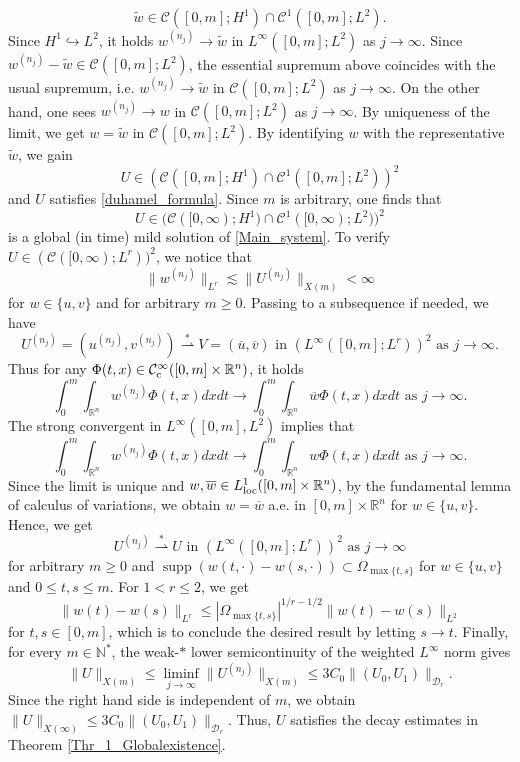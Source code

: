 \documentclass[11pt,reqno]{amsart}
\DeclareMathOperator{\supp}{supp}
\newcommand{\ity}{\infty}
\begin{document}
	\[
	\widetilde w\in \mathcal{C}([0,m];H^1)\cap \mathcal{C}^1([0,m];L^2).
	\]
	Since $H^1\hookrightarrow L^2$, it holds $w^{(n_j)}\to \widetilde w$ in $L^\infty([0,m];L^2)$ as $j\to \ity$. Since $w^{(n_j)}-\widetilde w\in \mathcal{C}([0,m];L^2)$, the essential supremum above coincides with the usual supremum, i.e. $w^{(n_j)}\to \widetilde w$ in $\mathcal{C}([0,m];L^2)$ as $j\to \ity$. On the other hand, one sees $w^{(n_j)}\to w$ in $\mathcal{C}([0,m];L^2)$ as $j\to \ity$. By uniqueness of the limit, we get $w=\widetilde w$ in $\mathcal{C}([0,m];L^2)$. By identifying $w$ with the representative $\widetilde w$, we gain
	\[
	U\in \left(\mathcal{C}([0,m];H^1)\cap \mathcal{C}^1([0,m];L^2)\right)^2
	\]
	and $U$ satisfies \eqref{duhamel_formula}. Since $m$ is arbitrary, one finds that
	\[
	U\in \bigl(\mathcal{C}([0,\infty);H^1)\cap \mathcal{C}^1([0,\infty);L^2)\bigr)^2
	\]
	is a global (in time) mild solution of \eqref{Main_system}. To verify $U\in(\mathcal{C}([0,\infty);L^r))^2$, we notice that
	\[
	\|w^{(n_j)}\|_{L^r}\lesssim \|U^{(n_j)}\|_{X(m)}<\infty
	\]
	for $w\in \{u,v\}$ and for arbitrary $m\geq 0$. Passing to a subsequence if needed, we have
	\[
	U^{(n_j)}=(u^{(n_j)},v^{(n_j)})\stackrel{*}{\rightharpoonup} V=(\overline{u},\overline{v})\text{ in }(L^\infty([0,m];L^r))^2\text{ as }j\to\ity.
	\]
	Thus for any $\Phi(t,x)\in \mathcal{C}^\infty_{\rm c}([0,m]\times \mathbb{R}^n)$, it holds
	\[
	\int_{0}^m\int_{\mathbb{R}^n}w^{(n_j)}\Phi(t,x)dxdt\to \int_{0}^m\int_{\mathbb{R}^n}\overline{w}\Phi(t,x)dxdt\text{ as }j\to\ity.
	\]
	The strong convergent in $L^\infty([0,m],L^2)$ implies that 
	\[
	\int_{0}^m\int_{\mathbb{R}^n}w^{(n_j)}\Phi(t,x)dxdt\to \int_{0}^m\int_{\mathbb{R}^n}w\Phi(t,x)dxdt\text{ as }j\to \ity.
	\]
	Since the limit is unique and $w,\overline{w}\in L^1_{\rm loc}([0,m]\times \mathbb{R}^n)$, by the fundamental lemma of calculus of variations, we obtain $w=\overline{w}$ a.e. in $[0,m]\times \mathbb{R}^n$ for $w\in \{u,v\}$. Hence, we get
	\[
	U^{(n_j)}\stackrel{*}{\rightharpoonup} U\text{ in }(L^\infty([0,m];L^r))^2\text{ as }j\to\ity
	\]
	for arbitrary $m\geq 0$ and $\supp (w(t,\cdot)-w(s,\cdot))\subset \Omega_{\max\{t,s\}}$ for $w\in\{u,v\}$ and $0\leq t,s\leq m$. For $1<r\leq 2$, we get
	\[
	\|w(t)-w(s)\|_{L^r}\leq |\Omega_{\max\{t,s\}}|^{1/r-1/2}\|w(t)-w(s)\|_{L^2}
	\]
	for $t,s\in[0,m]$, which is to conclude the desired result by letting $s\to t$. Finally, for every $m\in \mathbb N^*$, the weak-$*$ lower semicontinuity of the weighted $L^\infty$ norm gives
	\[
	\|U\|_{X(m)}\leq \liminf_{j\to\ity}\|U^{(n_j)}\|_{X(m)}\leq 3C_0\|(U_0,U_1)\|_{\mathcal{D}_r}.
	\]
	Since the right hand side is independent of $m$, we obtain $\|U\|_{X(\infty)}\leq 3C_0\|(U_0,U_1)\|_{\mathcal{D}_r}$. Thus, $U$ satisfies the decay estimates in Theorem \ref{Thr_1_Globalexistence}.
\end{document}
